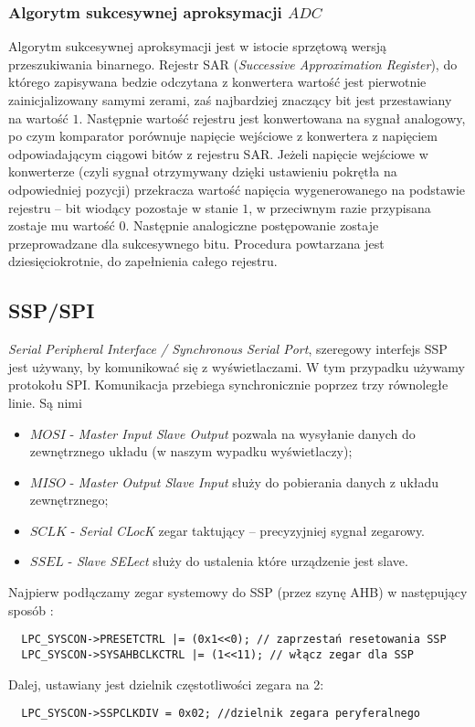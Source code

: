 \documentclass[a4paper,12pt,twoside]{article}
\theoremstyle{plain}
\theoremstyle{definition}
\theoremstyle{remark}
\begin{document}
	\subsubsection{Algorytm sukcesywnej aproksymacji $ADC$ \cite{ADCINST}}
	Algorytm sukcesywnej aproksymacji jest w istocie sprzętową wersją przeszukiwania binarnego. Rejestr SAR (\textit{Successive Approximation Register}), do którego zapisywana bedzie odczytana z konwertera wartość jest pierwotnie zainicjalizowany samymi zerami, zaś najbardziej znaczący bit jest przestawiany na wartość $1$. Następnie wartość rejestru jest konwertowana na sygnał analogowy, po czym komparator porównuje napięcie wejściowe z konwertera z napięciem odpowiadającym ciągowi bitów z rejestru SAR. Jeżeli napięcie wejściowe w konwerterze (czyli sygnał otrzymywany dzięki ustawieniu pokrętła na odpowiedniej pozycji) przekracza wartość napięcia wygenerowanego na podstawie rejestru -- bit wiodący pozostaje w stanie $1$, w przeciwnym razie przypisana zostaje mu wartość $0$. Następnie analogiczne postępowanie zostaje przeprowadzane dla sukcesywnego bitu. Procedura powtarzana jest dziesięciokrotnie, do zapełnienia całego rejestru.

\subsection{SSP/SPI}
\textit{Serial Peripheral Interface / Synchronous Serial Port}, szeregowy interfejs SSP jest używany, by komunikować się z wyświetlaczami. W tym przypadku używamy protokołu SPI. Komunikacja przebiega synchronicznie poprzez trzy równoległe linie. Są nimi
\begin{itemize}
	\item $MOSI$ - \textit{Master Input Slave Output} pozwala na wysyłanie danych do zewnętrznego układu (w naszym wypadku wyświetlaczy);
	\item $MISO$ - \textit{Master Output Slave Input} służy do pobierania danych z układu zewnętrznego;
	\item $SCLK$ - \textit{Serial CLocK} zegar taktujący -- precyzyjniej sygnał zegarowy.
	\item $SSEL$ - \textit{Slave SELect} służy do ustalenia które urządzenie jest slave.
\end{itemize} 
	Najpierw podłączamy zegar systemowy do SSP (przez szynę AHB) w następujący sposób \cite{INST}:
\begin{verbatim}
  LPC_SYSCON->PRESETCTRL |= (0x1<<0); // zaprzestań resetowania SSP
  LPC_SYSCON->SYSAHBCLKCTRL |= (1<<11); // włącz zegar dla SSP
\end{verbatim}
	Dalej, ustawiany jest dzielnik częstotliwości zegara na 2:
\begin{verbatim}
  LPC_SYSCON->SSPCLKDIV = 0x02;	//dzielnik zegara peryferalnego
\end{verbatim}
\end{document}
